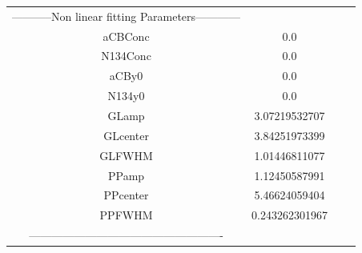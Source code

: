 \documentclass{article}
\begin{document}
\begin{tabular}{c c c c}

-----------Non linear fitting Parameters------------\\
aCBConc    &0.0\\
N134Conc   &0.0\\
aCBy0      &0.0\\
N134y0     &0.0\\
GLamp      &3.07219532707\\
GLcenter   &3.84251973399\\
GLFWHM     &1.01446811077\\
PPamp      &1.12450587991\\
PPcenter   &5.46624059404\\
PPFWHM     &0.243262301967\\
----------------------------------------------------\\


\end{tabular}
\end{document}
